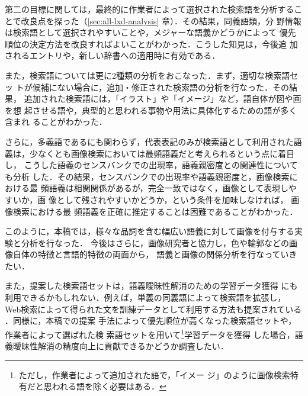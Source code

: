 \documentclass[japanese]{jnlp_1.4}
\begin{document}
第二の目標に関しては，最終的に作業者によって選択された検索語を分析するこ
とで改良点を探った（\ref{sec:all-lxd-analysis} 章）．その結果，同義語類，分
野情報は検索語として選択されやすいことや，メジャーな語義かどうかによって
優先順位の決定方法を改良すればよいことがわかった．こうした知見は，今後追
加されるエントリや，新しい辞書への適用時に有効である．


また，検索語については更に2種類の分析をおこなった．まず，適切な検索語セッ
トが候補にない場合に，追加・修正された検索語の分析を行なった．その結果，
追加された検索語には，「イラスト」や「イメージ」など，語自体が図や画を想
起させる語や，典型的と思われる事物や用法に具体化するための語が多く含まれ
ることがわかった．

さらに，多義語であるにも関わらず，代表表記のみが検索語として利用された語
義は，少なくとも画像検索においては最頻語義だと考えられるという点に着目し，
こうした語義のセンスバンクでの出現率，語義親密度との関連性についても分析
した．その結果，センスバンクでの出現率や語義親密度と，画像検索における最
頻語義は相関関係があるが，完全一致ではなく，画像として表現しやすいか，画
像として残されやすいかどうか，という条件を加味しなければ，
画像検索における最
頻語義を正確に推定することは困難であることがわかった．



このように，本稿では，様々な品詞を含む幅広い語義に対して画像を付与する実
験と分析を行なった．
今後はさらに，画像研究者と協力し，色や輪郭などの画像自体の特徴と言語的特徴の両面から，
語義と画像の関係分析を行なっていきたい．

また，提案した検索語セットは，語義曖昧性解消のための学習データ獲得
にも利用できるかもしれない．例えば，単義の同義語によって検索語を拡張し，
Web検索によって得られた文を訓練データとして利用する方法も提案されている
\cite{Mihalcea:Moldovan:1999,Agirre:Martinez:2000}．同様に，本稿での提案
手法によって優先順位が高くなった検索語セットや，作業者によって選ばれた検
索語セットを用いて\footnote{ただし，作業者によって追加された語で，「イメー
ジ」のように画像検索特有だと思われる語を除く必要はある．}学習データを獲得
した場合，語義曖昧性解消の精度向上に貢献できるかどうか調査したい．
\end{document}
